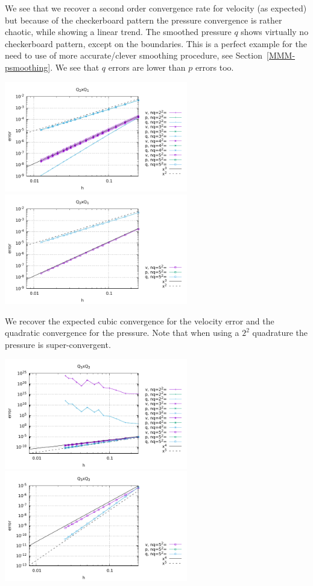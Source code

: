 We see that we recover a second order convergence rate for velocity (as expected) 
but because of the checkerboard pattern the pressure convergence is rather chaotic, while
showing a linear trend. 
The smoothed pressure $q$ shows virtually no checkerboard pattern, except on the boundaries.
This is a perfect example for the need to use of more accurate/clever smoothing procedure, see
Section~\ref{MMM-psmoothing}. We see that $q$ errors are lower than $p$ errors too.


\begin{center}
\includegraphics[width=8cm]{python_codes/fieldstone_48/results/errors2.pdf}
\includegraphics[width=8cm]{python_codes/fieldstone_48/results/errors2_b.pdf}
\end{center}

We recover the expected cubic convergence for the velocity error and the quadratic convergence 
for the pressure. Note that when using a $2^2$ quadrature the pressure is super-convergent.


\begin{center}
\includegraphics[width=8cm]{python_codes/fieldstone_48/results/errors3.pdf}
\includegraphics[width=8cm]{python_codes/fieldstone_48/results/errors3_b.pdf}
\end{center}

